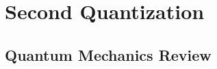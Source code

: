 \chapter{Second Quantization}
\label{ch:2ndquan}


\section{Quantum Mechanics Review}
\label{sec:qmreview}